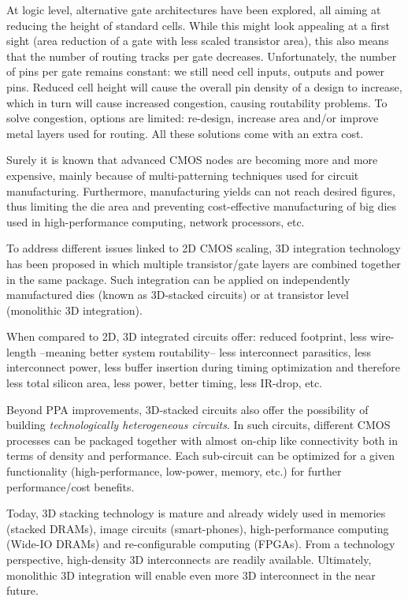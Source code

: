 \documentclass[conference]{IEEEtran}
\begin{document}
At logic level, alternative gate architectures have been explored, all aiming at reducing the height of standard cells. While this might look appealing at a first sight (area reduction of a gate with less scaled transistor area), this also means that the number of routing tracks per gate decreases. Unfortunately, the number of pins per gate remains constant: we still need cell inputs, outputs and power pins. Reduced cell height will cause the overall pin density of a design to increase, which in turn will cause increased congestion, causing routability problems. To solve congestion, options are limited: re-design, increase area and/or improve metal layers used for routing. All these solutions come with an extra cost.

Surely it is known that advanced CMOS nodes are becoming more and more expensive, mainly because of multi-patterning techniques used for circuit manufacturing. Furthermore, manufacturing yields can not reach desired figures, thus limiting the die area and preventing cost-effective manufacturing of big dies used in high-performance computing, network processors, etc. 

To address different issues linked to 2D CMOS scaling, 3D integration technology has been proposed in which multiple transistor/gate layers are combined together in the same package. Such integration can be applied on independently manufactured dies (known as 3D-stacked circuits) or at transistor level (monolithic 3D integration). 

When compared to 2D, 3D integrated circuits offer: reduced footprint, less wire-length --meaning better system routability-- less interconnect parasitics, less interconnect power, less buffer insertion during timing optimization and therefore less total silicon area, less power, better timing, less IR-drop, etc. 

Beyond PPA improvements, 3D-stacked circuits also offer the possibility of building  \emph{technologically heterogeneous circuits}. In such circuits, different CMOS processes can be packaged together with almost on-chip like connectivity both in terms of density and performance. Each sub-circuit can be optimized for a given functionality (high-performance, low-power, memory, etc.) for further performance/cost benefits.

Today, 3D stacking technology is mature and already widely used in memories (stacked DRAMs), image circuits (smart-phones), high-performance computing (Wide-IO DRAMs) and re-configurable computing (FPGAs). From a technology perspective, high-density 3D interconnects are readily available. Ultimately, monolithic 3D integration will enable even more 3D interconnect in the near future.
\end{document}
